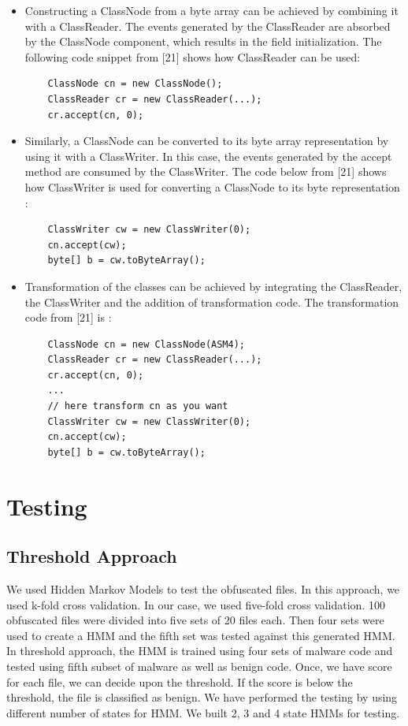 \begin{itemize}
\item Constructing a ClassNode from a byte array can be achieved by combining it with a ClassReader. The events generated by the ClassReader are absorbed by the ClassNode component, which results in the field initialization. The following code snippet from [21] shows how ClassReader can be used: 

\begin{verbatim}
    ClassNode cn = new ClassNode();
    ClassReader cr = new ClassReader(...);
    cr.accept(cn, 0);
\end{verbatim}

\item Similarly, a ClassNode can be converted to its byte array representation by using it with a ClassWriter. In this case, the events generated by the accept method are consumed by the ClassWriter. The code below from [21] shows how ClassWriter is used for converting a ClassNode to its byte representation :

\begin{verbatim}
    ClassWriter cw = new ClassWriter(0);
    cn.accept(cw); 
    byte[] b = cw.toByteArray();

\end{verbatim}

\item Transformation of the classes can be achieved by integrating the ClassReader, the ClassWriter and the addition of transformation code. The transformation code from [21] is :

\begin{verbatim}
    ClassNode cn = new ClassNode(ASM4);
    ClassReader cr = new ClassReader(...);
    cr.accept(cn, 0);
    ...
    // here transform cn as you want
    ClassWriter cw = new ClassWriter(0);
    cn.accept(cw);
    byte[] b = cw.toByteArray();
\end{verbatim}
\end{itemize}



 

\section{Testing}
\subsection{Threshold Approach}
We used Hidden Markov Models to test the obfuscated files. In this approach, we used k-fold cross validation. In our case, we used five-fold cross validation. 100 obfuscated files were divided into five sets of 20 files each. Then four sets were used to create a HMM and the fifth set was tested against this generated HMM. In threshold approach, the HMM is trained using four sets of malware code and tested using fifth subset of malware as well as benign code. Once, we have score for each file, we can decide upon the threshold. If the score is below the threshold, the file is classified as benign. We have performed the testing by using different number of states for HMM. We built 2, 3 and 4 state HMMs for testing.

